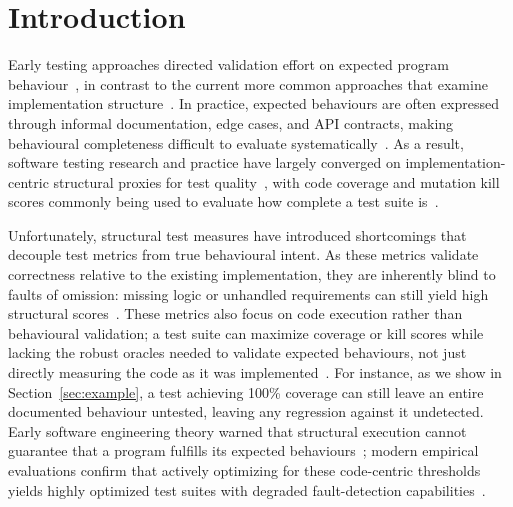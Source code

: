 \section{Introduction}
\label{sec:intro}

Early testing approaches directed validation effort on expected program behaviour~\cite{Howden1978FunctionalPT, richardson89}, in contrast to the current more common approaches that examine implementation structure~\cite{myers1979art}. 
In practice, expected behaviours are often expressed through informal documentation, edge cases, and API contracts, making behavioural completeness difficult to evaluate systematically~\cite{hossain2025doc2oracllinvestigatingimpactdocumentation, 10.1109/ICST.2012.110}. 
As a result, software testing research and practice have largely converged on implementation-centric structural proxies for test quality~\cite{howden1976reliability, Budd1978Design, zhu1997software}, with
code coverage and mutation kill scores 
commonly being used to evaluate 
how complete a test suite is~\cite{papadakis2019mutation, 10.1145/2568225.2568278, 10.1145/2635868.2635929}.

Unfortunately, structural test measures have introduced shortcomings that decouple test metrics from true behavioural intent. 
As these metrics validate correctness relative to the existing implementation, they are inherently blind to faults of omission: missing logic or unhandled requirements can still yield high structural scores~\cite{juristo2003functional, lawrance2005how}. 
%
These metrics also focus on code execution rather than behavioural validation; a test suite can maximize coverage or kill scores while lacking the robust oracles needed to validate expected behaviours, not just directly measuring the code as it was implemented~\cite{zhang2015assertions, petrovic2021does}. 
%
For instance, as we show in Section~\ref{sec:example}, a test achieving 100\% coverage can still leave an entire documented behaviour untested, leaving any regression against it undetected. 
%
Early software engineering theory warned that structural execution cannot guarantee that a program fulfills its expected behaviours~\cite{miller1963systematic, goodenough1975toward, hamlet1994foundations}; modern empirical evaluations confirm that actively optimizing for these code-centric thresholds yields highly optimized test suites with degraded fault-detection capabilities~\cite{10.1145/2568225.2568271, gay2015risks}.

